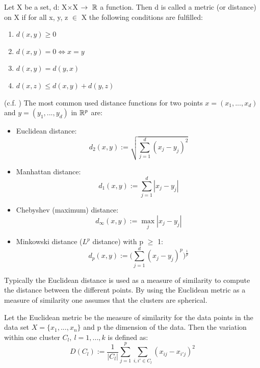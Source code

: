\begin{definition} Let X be a set, d: X$\times$X $\rightarrow~\mathbb{R}$ a function. Then d is called a metric (or distance) on X if for all x, y, z $\in$ X the following conditions are fulfilled: 
\begin{enumerate}[label=(\subscript{D}{\arabic*})]
	\item $d(x,y) \geq 0$
	\item $d(x,y) = 0 \Leftrightarrow x = y$
	\item $d(x,y) = d(y,x)$
	\item $d(x,z) \leq d(x,y) + d(y,z)$
\end{enumerate}

\begin{example}(c.f. \cite{analysis_1}) The most common used distance functions for two points $x=(x_1, ..., x_d)$ and  $y=(y_1, ..., y_d)$ in $\mathbb{R}^p$ are: 
	\begin{itemize}[label=$\star$]
		\item Euclidean distance:
			\begin{equation*}
				d_2(x,y) := \sqrt{\sum_{j=1}^d(x_j - y_j)^2}
			\end{equation*}
		\item Manhattan distance:
			\begin{equation*}
				d_1(x,y) := \sum_{j=1}^d|x_j - y_j|
			\end{equation*}
		\item Chebyshev (maximum) distance:
			\begin{equation*}
				d_\infty(x,y) := \max_j|x_j - y_j|
			\end{equation*}		
		\item Minkowski distance ($L^p$ distance) with p $\geq$ 1:
			\begin{equation*}
				d_p(x,y) := \bigg(\sum_{j=1}^d(x_j - y_j)^p\bigg)^{\frac{1}{p}}
			\end{equation*}	
	\end{itemize}
\end{example}

\end{definition}
Typically the Euclidean distance is used as a measure of similarity to compute the distance between the different points. By using the Euclidean metric as a measure of similarity one assumes that the clusters are spherical. 
\begin{definition}
	 Let the Euclidean metric be the measure of similarity for the data points in the data set $X=\{x_1, ..., x_n\}$ and p the dimension of the data. Then the variation within one cluster $C_l,~l=1, ..., k$ is defined as:  
	\begin{equation*}
		D(C_l) := \frac{1}{|C_l|}\sum_{j=1}^p \sum_{i,i' \in C_l} (x_{ij} - x_{i'j})^2
	\end{equation*}
\end{definition}

